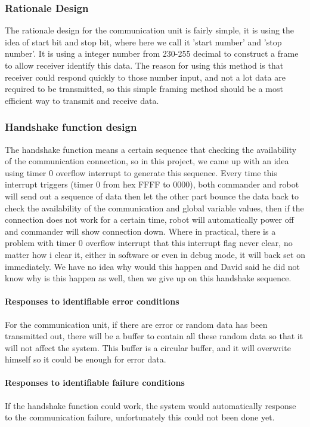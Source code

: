 \documentclass[MTRX3700report.tex]{subfiles}
\begin{document}
\subsubsection{Rationale Design}
The rationale design for the communication unit is fairly simple, it is using the idea of start bit and stop bit, where here we call it 'start number' and 'stop number'. It is using a integer number from 230-255 decimal to construct a frame to allow receiver identify this data. The reason for using this method is that receiver could respond quickly to those number input, and not a lot data are required to be transmitted, so this simple framing method should be a most efficient way to transmit and receive data.
\subsubsection{Handshake function design}
The handshake function means a certain sequence that checking the availability of the communication connection, so in this project, we came up with an idea using timer 0 overflow interrupt to generate this sequence. Every time this interrupt triggers (timer 0 from hex FFFF to 0000), both commander and robot will send out a sequence of data then let the other part bounce the data back to check the availability of the communication and global variable values, then if the connection does not work for a certain time, robot will automatically power off and commander will show connection down. Where in practical, there is a problem with timer 0 overflow interrupt that this interrupt flag never clear, no matter how i clear it, either in software or even in debug mode, it will back set on immediately. We have no idea why would this happen and David said he did not know why is this happen as well, then we give up on this handshake sequence.
\paragraph{Responses to identifiable error conditions}
For the communication unit, if there are error or random data has been transmitted out, there will be a buffer to contain all these random data so that it will not affect the system. This buffer is a circular buffer, and it will overwrite himself so it could be enough for error data.
\paragraph{Responses to identifiable failure conditions}
If the handshake function could work, the system would automatically response to the communication failure, unfortunately this could not been done yet.
\end{document}
